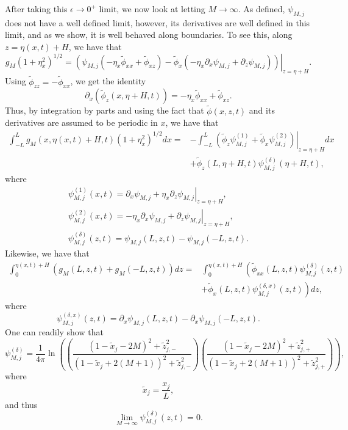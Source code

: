 \documentclass[a4paper,11pt]{article}
\newcommand{\p}{\partial}
\begin{document}
After taking this $\epsilon\rightarrow 0^{+}$ limit, we now look at letting $M\rightarrow\infty$.  As defined, $\psi_{M,j}$ does not have a well defined limit, however, its derivatives are well defined in this limit, and as we show, it is well behaved along boundaries.  To see this, along $z = \eta(x,t) + H$, we have that 
\[
g_{M}(1+\eta_{x}^{2})^{1/2} = \left.\left(\psi_{M,j}\left(- \eta_{x}\tilde{\phi}_{xx}+\tilde{\phi}_{xz}\right)-\tilde{\phi}_{x}\left(-\eta_{x}\p_{x}\psi_{M,j}+\p_{z}\psi_{M,j}\right) \right)\right|_{z= \eta+H}.
\]
Using $\tilde{\phi}_{zz} = -\tilde{\phi}_{xx}$, we get the identity
\[
\p_{x}\left(\tilde{\phi}_{z}(x, \eta+H,t) \right) = -\eta_{x}\tilde{\phi}_{xx} + \tilde{\phi}_{xz}.
\]
Thus, by integration by parts and using the fact that $\tilde{\phi}(x,z,t)$ and its derivatives are assumed to be periodic in $x$, we have that 
\begin{align*}
\int_{-L}^{L}g_{M}(x,\eta(x,t)+H,t) (1+\eta_{x}^{2})^{1/2}dx = & -\int_{-L}^{L} \left.\left(\tilde{\phi}_{z}\psi^{(1)}_{M,j}+\tilde{\phi}_{x}\psi^{(2)}_{M,j}\right)\right|_{z=\eta+H}dx \\
& + \tilde{\phi}_{z}(L,\eta+H,t)\psi^{(\delta)}_{M,j}(\eta+H,t),
\end{align*}
where
\begin{align*}
\psi^{(1)}_{M,j}(x,t) = \left.\p_{x}\psi_{M,j}+ \eta_{x}\p_{z}\psi_{M,j}\right|_{z=\eta+H}, \\
\psi^{(2)}_{M,j}(x,t) = \left.-\eta_{x}\p_{x}\psi_{M,j} + \p_{z}\psi_{M,j}\right|_{z=\eta+H}, \\
\psi^{(\delta)}_{M,j}(z,t) = \psi_{M,j}(L,z,t)-\psi_{M,j}(-L,z,t).
\end{align*}
Likewise, we have that 
\begin{align*}
\int_{0}^{\eta(x,t)+H} \left(g_{M}(L,z,t) + g_{M}(-L,z,t)\right) dz = & \int_{0}^{\eta(x,t)+H} \left(\tilde{\phi}_{xx}(L,z,t)\psi^{(\delta)}_{M,j}(z,t) \right.  \\
&\left. + \tilde{\phi}_{x}(L,z,t)\psi^{(\delta,x)}_{M,j}(z,t) \right) dz, 
\end{align*}
where
\[
\psi^{(\delta,x)}_{M,j}(z,t) = \p_{x}\psi_{M,j}(L,z,t)-\p_{x}\psi_{M,j}(-L,z,t). 
\]
One can readily show that 
\[
\psi_{M,j}^{(\delta)} = \frac{1}{4\pi}\ln\left(\left(\frac{(1-\tilde{x}_{j}-2M)^{2}+\tilde{z}_{j,-}^{2}}{(1-\tilde{x}_{j}+2(M+1))^{2}+\tilde{z}_{j,-}^{2}}\right) \left(\frac{(1-\tilde{x}_{j}-2M)^{2}+\tilde{z}_{j,+}^{2}}{(1-\tilde{x}_{j}+2(M+1))^{2}+\tilde{z}_{j,+}^{2}}\right) \right),
\]
where
\[
\tilde{x}_{j} = \frac{x_{j}}{L},
\]
and thus 
\[
\lim_{M\rightarrow\infty}\psi_{M,j}^{(\delta)}(z,t) = 0.
\]
\end{document}
